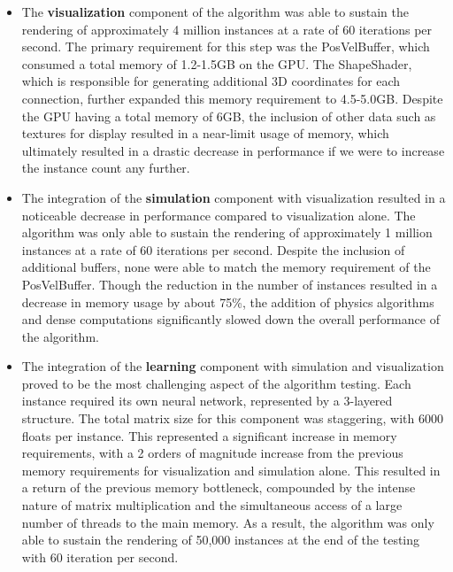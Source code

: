 \begin{itemize}
    \item The \textbf{visualization} component of the algorithm was able to sustain the rendering of approximately 4 million instances at a rate of 60 iterations per second. The primary requirement for this step was the PosVelBuffer, which consumed a total memory of 1.2-1.5GB on the GPU. The ShapeShader, which is responsible for generating additional 3D coordinates for each connection, further expanded this memory requirement to 4.5-5.0GB. Despite the GPU having a total memory of 6GB, the inclusion of other data such as textures for display resulted in a near-limit usage of memory, which ultimately resulted in a drastic decrease in performance if we were to increase the instance count any further.

    \item The integration of the \textbf{simulation} component with visualization resulted in a noticeable decrease in performance compared to visualization alone. The algorithm was only able to sustain the rendering of approximately 1 million instances at a rate of 60 iterations per second. Despite the inclusion of additional buffers, none were able to match the memory requirement of the PosVelBuffer. Though the reduction in the number of instances resulted in a decrease in memory usage by about 75\%, the addition of physics algorithms and dense computations significantly slowed down the overall performance of the algorithm.

    \item The integration of the \textbf{learning} component with simulation and visualization proved to be the most challenging aspect of the algorithm testing. Each instance required its own neural network, represented by a 3-layered structure. The total matrix size for this component was staggering, with 6000 floats per instance. This represented a significant increase in memory requirements, with a 2 orders of magnitude increase from the previous memory requirements for visualization and simulation alone. This resulted in a return of the previous memory bottleneck, compounded by the intense nature of matrix multiplication and the simultaneous access of a large number of threads to the main memory. As a result, the algorithm was only able to sustain the rendering of 50,000 instances at the end of the testing with 60 iteration per second.


\end{itemize}
